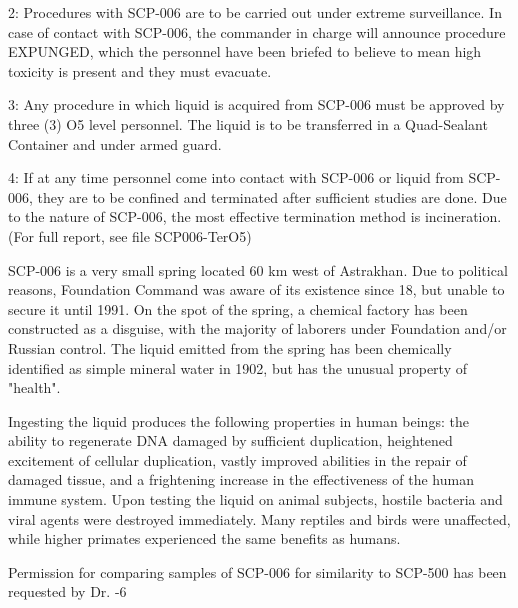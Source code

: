 2: Procedures with SCP-006 are to be carried out under extreme surveillance. In case of contact with SCP-006, the commander in charge will announce procedure \lb EXPUNGED\rb, which the personnel have been briefed to believe to mean high toxicity is present and they must evacuate.

3: Any procedure in which liquid is acquired from SCP-006 must be approved by three (3) O5 level personnel. The liquid is to be transferred in a Quad-Sealant Container and under armed guard.

4: If at any time personnel come into contact with SCP-006 or liquid from SCP-006, they are to be confined and terminated after sufficient studies are done. Due to the nature of SCP-006, the most effective termination method is incineration. (For full report, see file SCP006-TerO5)

 SCP-006 is a very small spring located 60 km west of Astrakhan. Due to political reasons, Foundation Command was aware of its existence since 18, but unable to secure it until 1991. On the spot of the spring, a chemical factory has been constructed as a disguise, with the majority of laborers under Foundation and/or Russian control. The liquid emitted from the spring has been chemically identified as simple mineral water in 1902, but has the unusual property of "health".

Ingesting the liquid produces the following properties in human beings: the ability to regenerate DNA damaged by sufficient duplication, heightened excitement of cellular duplication, vastly improved abilities in the repair of damaged tissue, and a frightening increase in the effectiveness of the human immune system. Upon testing the liquid on animal subjects, hostile bacteria and viral agents were destroyed immediately. Many reptiles and birds were unaffected, while higher primates experienced the same benefits as humans.

 Permission for comparing samples of SCP-006 for similarity to SCP-500 has been requested by Dr. -6